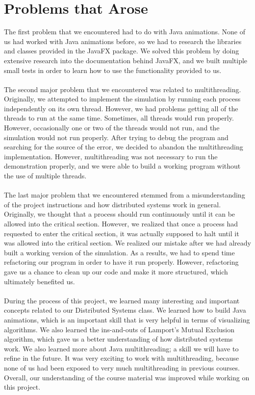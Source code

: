 \documentclass [11pt] {article}
\begin{document}
	\section {Problems that Arose}
	\qquad The first problem that we encountered had to do with Java animations.  None of us had worked with Java animations before, so we had to research the libraries and classes provided in the JavaFX package.  We solved this problem by doing extensive research into the documentation behind JavaFX, and we built multiple small tests in order to learn how to use the functionality provided to us.  
	\paragraph {}
	\qquad The second major problem that we encountered was related to multithreading.  Originally, we attempted to implement the simulation by running each process independently on its own thread.  However, we had problems getting all of the threads to run at the same time.  Sometimes, all threads would run properly.  However, occasionally one or two of the threads would not run, and the simulation would not run properly.  After trying to debug the program and searching for the source of the error, we decided to abandon the multithreading implementation.  However, multithreading was not necessary to run the demonstration properly, and we were able to build a working program without the use of multiple threads.
	\paragraph {}
	\qquad The last major problem that we encountered stemmed from a misunderstanding of the project instructions and how distributed systems work in general.  Originally, we thought that a process should run continuously until it can be allowed into the critical section.  However, we realized that once a process had requested to enter the critical section, it was actually supposed to halt until it was allowed into the critical section.  We realized our mistake after we had already built a working version of the simulation.  As a results, we had to spend time refactoring our program in order to have it run properly.  However, refactoring gave us a chance to clean up our code and make it more structured, which ultimately benefited us.
	\paragraph {} 
	\qquad During the process of this project, we learned many interesting and important concepts related to our Distributed Systems class.  We learned how to build Java animations, which is an important skill that is very helpful in terms of visualizing algorithms.  We also learned the ins-and-outs of Lamport's Mutual Exclusion algorithm, which gave us a better understanding of how distributed systems work.  We also learned more about Java multithreading; a skill we will have to refine in the future.  It was very exciting to work with multithreading, because none of us had been exposed to very much multithreading in previous courses.  Overall, our understanding of the course material was improved while working on this project.
\end{document}
